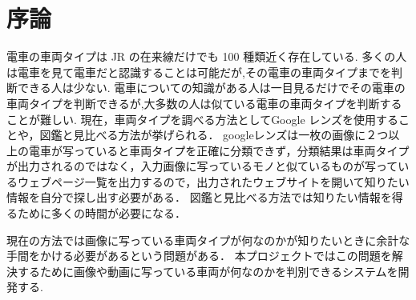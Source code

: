 

\chapter{序論}

電車の車両タイプは JR の在来線だけでも 100 種類近く存在している.
多くの人は電車を見て電車だと認識することは可能だが,その電車の車両タイプまでを判断できる人は少ない.
電車についての知識がある人は一目見るだけでその電車の車両タイプを判断できるが,大多数の人は似ている電車の車両タイプを判断することが難しい.
現在，車両タイプを調べる方法としてGoogle レンズを使用することや，図鑑と見比べる方法が挙げられる．
googleレンズは一枚の画像に２つ以上の電車が写っていると車両タイプを正確に分類できず，分類結果は車両タイプが出力されるのではなく，入力画像に写っているモノと似ているものが写っているウェブページ一覧を出力するので，出力されたウェブサイトを開いて知りたい情報を自分で探し出す必要がある．
図鑑と見比べる方法では知りたい情報を得るために多くの時間が必要になる．

現在の方法では画像に写っている車両タイプが何なのかが知りたいときに余計な手間をかける必要があるという問題がある．
本プロジェクトではこの問題を解決するために画像や動画に写っている車両が何なのかを判別できるシステムを開発する.



